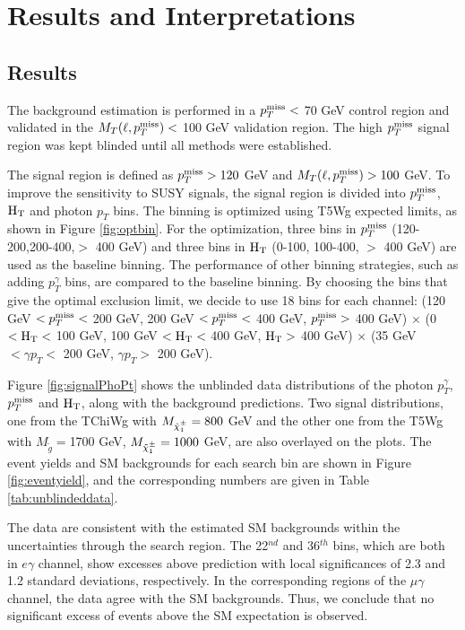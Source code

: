 \documentclass[thesis.tex]{subfiles}
\renewcommand\_{\textunderscore\allowbreak}
\begin{document}
\chapter{Results and Interpretations}
\label{ch7}

\section{Results}
The background estimation is performed in a $p_T^\textrm{miss} < $ 70 GeV control region and validated in the $M_T(\ell, p_T^\textrm{miss}) < $ 100 GeV validation region. The high $p_T^\textrm{miss}$ signal region was kept blinded until all methods were established.

The signal region is defined as $p_T^\textrm{miss} > 120$ GeV and $M_T(\ell, p_T^\textrm{miss}) > 100$ GeV. To improve the sensitivity to SUSY signals, the signal region is divided into $p_T^\textrm{miss}$, $\textrm{H}_\textrm{T}$ and photon $p_T$ bins. The binning is optimized using T5Wg expected limits, as shown in Figure \ref{fig:optbin}. For the optimization, three bins in $p_T^\textrm{miss}$ (120-200,200-400,$>$ 400 GeV) and three bins in $\textrm{H}_\textrm{T}$ (0-100, 100-400, $ >$ 400 GeV) are used as the baseline binning. The performance of other binning strategies, such as adding $p^\gamma_T$ bins, are compared to the baseline binning. 
By choosing the bins that give the optimal exclusion limit, we decide to use 18 bins for each channel:  
(120 GeV $< p_T^\textrm{miss} <$ 200 GeV, 200 GeV $< p_T^\textrm{miss} <$ 400 GeV, $ p_T^\textrm{miss} >$ 400 GeV) $\times$ (0 $< \textrm{H}_\textrm{T} <$ 100 GeV, 100 GeV $< \textrm{H}_\textrm{T} <$ 400 GeV, $\textrm{H}_\textrm{T} >$ 400 GeV) $\times$ (35 GeV $< \gamma p_T < $ 200 GeV, $\gamma p_T > $ 200 GeV).

Figure \ref{fig:signalPhoPt} shows the unblinded data distributions of the photon $p_T^{\gamma}$, $p_T^\textrm{miss}$ and $\textrm{H}_\textrm{T}$, along with the background predictions. Two signal distributions, one from the TChiWg with $M_{\tilde{\chi}_1^\pm} = 800$ GeV and the other one from the T5Wg with $M_{\tilde{g}} = $1700 GeV, $M_{\tilde{\chi}_1^\pm} = 1000$ GeV, are also overlayed on the plots. The event yields and SM backgrounds for each search bin are shown in Figure \ref{fig:eventyield}, and the corresponding numbers are given in Table \ref{tab:unblindeddata}. 

The data are consistent with the estimated SM backgrounds within the uncertainties through the search region. 
The 22$^{nd}$ and 36$^{th}$ bins, which are both in $e\gamma$ channel, show excesses above prediction with local significances of 2.3 and 1.2 standard deviations, respectively.
In the corresponding regions of the $\mu\gamma$ channel, the data agree with the SM backgrounds.
Thus, we conclude that no significant excess of events above the SM expectation is observed. 
\end{document}

